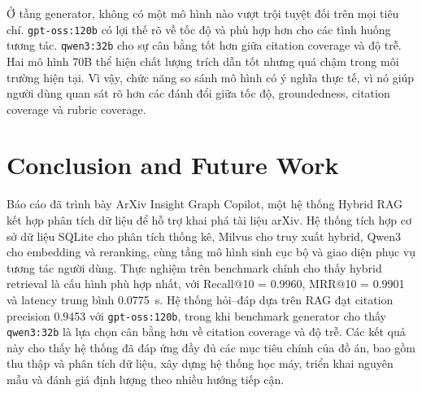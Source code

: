\documentclass[conference]{IEEEtran}
\newcommand{\systemname}{ArXiv Insight Graph Copilot}
\begin{document}
Ở tầng generator, không có một mô hình nào vượt trội tuyệt đối trên mọi tiêu chí. \texttt{gpt-oss:120b} có lợi thế rõ về tốc độ và phù hợp hơn cho các tình huống tương tác. \texttt{qwen3:32b} cho sự cân bằng tốt hơn giữa citation coverage và độ trễ. Hai mô hình 70B thể hiện chất lượng trích dẫn tốt nhưng quá chậm trong môi trường hiện tại. Vì vậy, chức năng so sánh mô hình có ý nghĩa thực tế, vì nó giúp người dùng quan sát rõ hơn các đánh đổi giữa tốc độ, groundedness, citation coverage và rubric coverage.

\section{Conclusion and Future Work}

Báo cáo đã trình bày \systemname, một hệ thống Hybrid RAG kết hợp phân tích dữ liệu để hỗ trợ khai phá tài liệu arXiv. Hệ thống tích hợp cơ sở dữ liệu SQLite cho phân tích thống kê, Milvus cho truy xuất hybrid, Qwen3 cho embedding và reranking, cùng tầng mô hình sinh cục bộ và giao diện phục vụ tương tác người dùng. Thực nghiệm trên benchmark chính cho thấy hybrid retrieval là cấu hình phù hợp nhất, với Recall@10 = 0.9960, MRR@10 = 0.9901 và latency trung bình 0.0775~s. Hệ thống hỏi--đáp dựa trên RAG đạt citation precision 0.9453 với \texttt{gpt-oss:120b}, trong khi benchmark generator cho thấy \texttt{qwen3:32b} là lựa chọn cân bằng hơn về citation coverage và độ trễ. Các kết quả này cho thấy hệ thống đã đáp ứng đầy đủ các mục tiêu chính của đồ án, bao gồm thu thập và phân tích dữ liệu, xây dựng hệ thống học máy, triển khai nguyên mẫu và đánh giá định lượng theo nhiều hướng tiếp cận.
\end{document}
